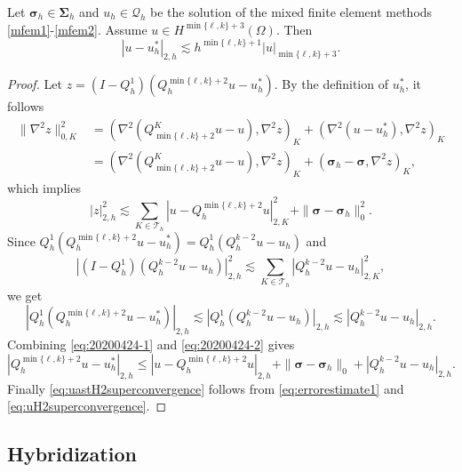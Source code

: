 \begin{theorem}
Let $\boldsymbol \sigma_h\in\boldsymbol\Sigma_h$ and $u_h\in \mathcal Q_h$ be the solution of the mixed finite element methods \eqref{mfem1}-\eqref{mfem2}. Assume $u\in H^{\min\{\ell,k\}+3}(\Omega)$. Then
\begin{equation}\label{eq:uastH2superconvergence}
|u-u_h^{\ast}|_{2,h}\lesssim h^{\min\{\ell,k\}+1}|u|_{\min\{\ell,k\}+3}.
\end{equation}
\end{theorem}
\begin{proof}
Let $z=(I-Q_h^1)(Q_h^{\min\{\ell,k\}+2}u-u_h^{\ast})$. By the definition of $u_h^{\ast}$, it follows
\begin{align*}
\|\nabla^2z\|_{0,K}^2&=(\nabla^2(Q_{\min\{\ell,k\}+2}^Ku-u), \nabla^2z)_{K}+(\nabla^2(u-u_h^{\ast}), \nabla^2z)_{K} \\
&=(\nabla^2(Q_{\min\{\ell,k\}+2}^Ku-u), \nabla^2z)_{K}+(\boldsymbol \sigma_h-\boldsymbol \sigma, \nabla^2z)_{K},
\end{align*}
which implies
\begin{equation}\label{eq:20200424-1}
|z|_{2,h}^2\lesssim \sum_{K\in\mathcal T_h}|u-Q_h^{\min\{\ell,k\}+2}u|_{2,K}^2+\|\boldsymbol \sigma-\boldsymbol \sigma_h\|_{0}^2.
\end{equation}
Since $Q_h^1(Q_h^{\min\{\ell,k\}+2}u-u_h^{\ast})=Q_h^1(Q_h^{k-2}u-u_h)$ and
\[
|(I-Q_h^1)(Q_h^{k-2}u-u_h)|_{2,h}^2\lesssim \sum_{K\in\mathcal T_h}|Q_h^{k-2}u-u_h|_{2,K}^2,
\]
we get
\begin{equation}\label{eq:20200424-2}
|Q_h^1(Q_h^{\min\{\ell,k\}+2}u-u_h^{\ast})|_{2,h}\lesssim |Q_h^1(Q_h^{k-2}u-u_h)|_{2,h}\lesssim |Q_h^{k-2}u-u_h|_{2,h}.
\end{equation}
Combining \eqref{eq:20200424-1} and \eqref{eq:20200424-2} gives
\[
|Q_h^{\min\{\ell,k\}+2}u-u_h^{\ast}|_{2,h}\leq |u-Q_h^{\min\{\ell,k\}+2}u|_{2,h}+\|\boldsymbol \sigma-\boldsymbol \sigma_h\|_{0}+|Q_h^{k-2}u-u_h|_{2,h}.
\]
Finally \eqref{eq:uastH2superconvergence} follows from \eqref{eq:errorestimate1} and \eqref{eq:uH2superconvergence}.
\end{proof}


\subsection{Hybridization}

